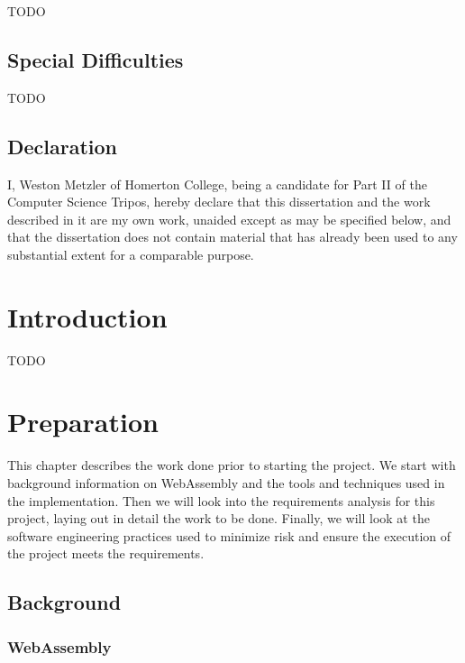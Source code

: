 \documentclass[12pt,a4paper,twoside,openright]{report}
\begin{document}
TODO

\section*{Special Difficulties}

TODO

\newpage
\section*{Declaration}

I, Weston Metzler of Homerton College, being a candidate for Part II of the Computer
Science Tripos, hereby declare that this dissertation and the work described in
it are my own work, unaided except as may be specified below, and that the
dissertation does not contain material that has already been used to any substantial
extent for a comparable purpose.

\bigskip
{}

\medskip
{}

\tableofcontents

\listoffigures


\pagestyle{headings}

\chapter{Introduction}

TODO

\chapter{Preparation}

This chapter describes the work done prior to starting the project.
We start with background information on WebAssembly and the tools and techniques used in the implementation.
Then we will look into the requirements analysis for this project, laying out in detail the work to be done.
Finally, we will look at the software engineering practices used to minimize risk and ensure the execution of the project meets the requirements.

\section{Background}
\subsection{WebAssembly}
\end{document}
